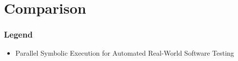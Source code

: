 \documentclass{beamer}
\begin{document}
	
	\section{Comparison}
	
	\begin{frame}
		\frametitle{Legend}
		
		\begin{itemize}
			\color{Paper1Full}  \item Parallel Symbolic Execution for Automated Real-World Software Testing

\end{itemize}
\end{frame}
\end{document}
